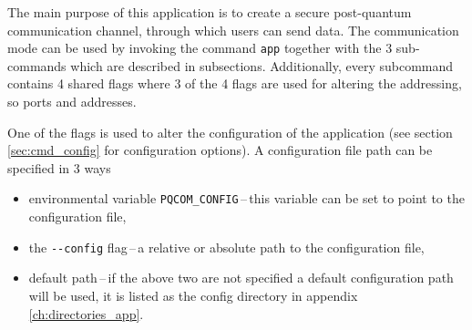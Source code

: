 The main purpose of this application is to create a secure post-quantum communication channel, through which users can send data. The communication mode can be used by invoking the command \texttt{app} together with the 3 sub-commands which are described in subsections. Additionally, every subcommand contains 4 shared flags where 3 of the 4 flags are used for altering the addressing, so ports and addresses.

One of the flags is used to alter the configuration of the application (see section \ref{sec:cmd_config} for configuration options). A configuration file path can be specified in 3 ways
\newpage
\begin{itemize}
  \item environmental variable \texttt{PQCOM\_CONFIG}\,--\,this variable can be set to point to the configuration file,
  \item the \texttt{-\--config} flag\,--\,a relative or absolute path to the configuration file,
  \item default path\,--\,if the above two are not specified a default configuration path will be used, it is listed as the config directory in appendix \ref{ch:directories_app}.
\end{itemize}
